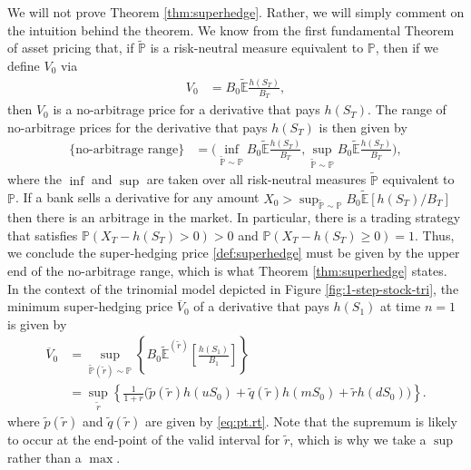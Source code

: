 \documentclass[12pt]{book}
\numberwithin{equation}{chapter}
\theoremstyle{plain}
\numberwithin{theorem}{section}
\theoremstyle{definition}
\numberwithin{exercise}{chapter}
\newcommand{\<}{\langle}
\renewcommand{\>}{\rangle}
\renewcommand{\(}{\left(}
\renewcommand{\)}{\right)}
\renewcommand{\[}{\left[}
\renewcommand{\]}{\right]}
\newcommand\Eb{\mathds{E}}
\newcommand\Pb{\mathds{P}}
\newcommand\Ebt{\widetilde{\Eb}}
\newcommand\Pbt{\widetilde{\Pb}}
\newcommand\qt{\widetilde{q}}
\newcommand\rt{\widetilde{r}}
\theoremstyle{definition}
\numberwithin{question}{section}
\newcommand\pt{\widetilde{p}}
\begin{document}
\noindent
We will not prove Theorem \ref{thm:superhedge}.  Rather, we will simply comment on the intuition behind the theorem.  We know from the first fundamental Theorem of asset pricing that, if $\Pbt$ is a risk-neutral measure equivalent to $\Pb$, then if we define $V_0$ via
\begin{align}
V_0
	&=	B_0 \Ebt \frac{h(S_T)}{B_T} ,
\end{align}
then $V_0$ is a no-arbitrage price for a derivative that pays $h(S_T)$.  The range of no-arbitrage prices for the derivative that pays $h(S_T)$ is then given by
\begin{align}
\{ \text{no-arbitrage range} \}
	&=	\bigg( \inf_{\Pbt \sim \Pb} B_0 \Ebt \frac{h(S_T)}{B_T} , \sup_{\Pbt \sim \Pb} B_0 \Ebt \frac{h(S_T)}{B_T} \bigg) ,
\end{align}
where the $\inf$ and $\sup$ are taken over all risk-neutral measures $\Pbt$ equivalent to $\Pb$.
If a bank sells a derivative for any amount $X_0 > \sup_{\Pbt \sim \Pb} B_0 \Ebt[h(S_T)/B_T]$ then there is an arbitrage in the market.  In particular, there is a trading strategy that satisfies $\Pb( X_T - h(S_T) > 0) > 0$ and $\Pb( X_T - h(S_T) \geq 0) = 1$.
Thus, we conclude the super-hedging price \eqref{def:superhedge} must be given by the upper end of the no-arbitrage range, which is what Theorem \ref{thm:superhedge} states.
\\[0.5em]
In the context of the trinomial model depicted in Figure \ref{fig:1-step-stock-tri}, the minimum super-hedging price $\overline{V}_0$ of a derivative that pays $h(S_1)$ at time $n=1$ is given by
\begin{align}
\overline{V}_0
		&= \sup_{\Pbt (\rt) \sim \Pb} \left\{ B_0 \Ebt^{(\rt)} \[ \frac{h(S_1)}{B_1} \] \right\} \\
		&= \sup_{\rt}  \left\{ \frac{1}{1+r} \Big( \pt (\rt) h(u S_0) +  \qt (\rt) h (m S_0) + \rt h(d S_0)\Big)	\right\}.	 \label{eq:superhedge-trinomial}
\end{align}
where $\pt(\rt)$ and $\qt(\rt)$ are given by \eqref{eq:pt.rt}.  Note that the supremum is likely to occur at the end-point of the valid interval for $\rt$, which is why we take a $\sup$ rather than a $\max$.
\end{document}
